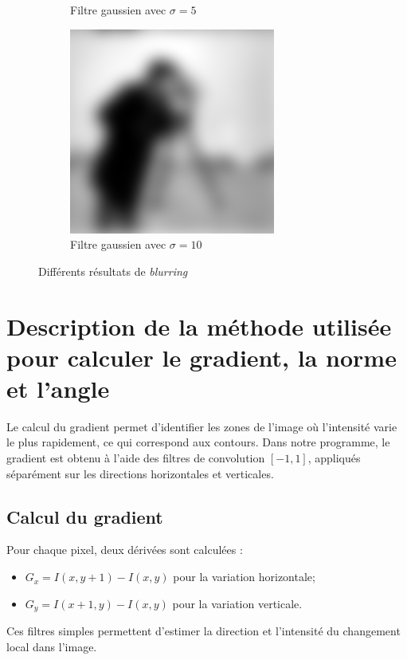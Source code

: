 \documentclass{article}
\begin{document}
\begin{figure}[H]
\begin{subfigure}[b]{0.45\linewidth}
        \caption{Filtre gaussien avec $\sigma = 5$}
    \end{subfigure}
    \begin{subfigure}[b]{0.45\linewidth}
        \centering
        \includegraphics[scale = 0.5]{TpIFT6150-2-filtre-gaussien_10.png}
        \caption{Filtre gaussien avec $\sigma = 10$}
    \end{subfigure}
    \caption{Différents résultats de \textit{blurring}}
\end{figure}

\section*{Description de la méthode utilisée pour calculer le gradient, la norme et l'angle}

Le calcul du gradient permet d’identifier les zones de l’image où l’intensité varie le plus rapidement, ce qui correspond aux contours.  
Dans notre programme, le gradient est obtenu à l’aide des filtres de convolution \([-1, 1]\), appliqués séparément sur les directions horizontales et verticales.

\subsection*{Calcul du gradient}
Pour chaque pixel, deux dérivées sont calculées :
\begin{itemize}
    \item \( G_x = I(x, y+1) - I(x, y) \) pour la variation horizontale;
    \item \( G_y = I(x+1, y) - I(x, y) \) pour la variation verticale.
\end{itemize}
Ces filtres simples permettent d’estimer la direction et l’intensité du changement local dans l’image.
\end{document}
